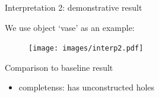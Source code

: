 \documentclass[10pt]{beamer}
\begin{document}
\begin{frame}{Interpretation 2: demonstrative result}

We use object `vase' as an example:
\begin{figure}
\centering
\texttt{[image: images/interp2.pdf]}
\end{figure}

\begin{exampleblock}{Comparison to baseline result}
\begin{itemize}
\item completenss: has unconstructed holes
\end{itemize}
\end{exampleblock}

\end{frame}
\end{document}
